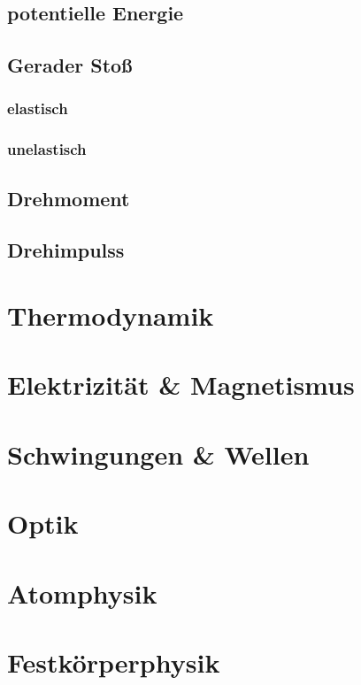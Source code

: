 \documentclass[10pt,a4paper]{article}
\begin{document}
	\subsection{potentielle Energie}
	\subsection{Gerader Stoß}
	\subsubsection{elastisch}
	\subsubsection{unelastisch}
	\subsection{Drehmoment}
	\subsection{Drehimpulss}





	\section{Thermodynamik}

	\section{Elektrizität & Magnetismus}

	\section{Schwingungen & Wellen}

	\section{Optik}

	\section{Atomphysik}

	\section{Festkörperphysik}
\end{document}
